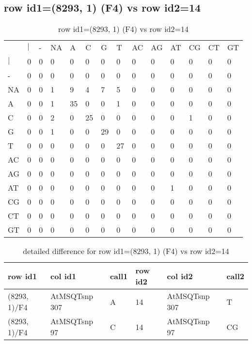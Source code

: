 \subsection{row id1=(8293, 1) (F4) vs row id2=14}
\begin{center}
\begin{longtable}{|l|l|l|l|l|l|l|l|l|l|l|l|l|l|}
\caption{row id1=(8293, 1) (F4) vs row id2=14} \label{table_dm270}\\
\hline
\\
\hline
&$|$&-&NA&A&C&G&T&AC&AG&AT&CG&CT&GT\\
$|$&0&0&0&0&0&0&0&0&0&0&0&0&0\\
-&0&0&0&0&0&0&0&0&0&0&0&0&0\\
NA&0&0&1&9&4&7&5&0&0&0&0&0&0\\
A&0&0&1&35&0&0&1&0&0&0&0&0&0\\
C&0&0&2&0&25&0&0&0&0&0&1&0&0\\
G&0&0&1&0&0&29&0&0&0&0&0&0&0\\
T&0&0&0&0&0&0&27&0&0&0&0&0&0\\
AC&0&0&0&0&0&0&0&0&0&0&0&0&0\\
AG&0&0&0&0&0&0&0&0&0&0&0&0&0\\
AT&0&0&0&0&0&0&0&0&0&1&0&0&0\\
CG&0&0&0&0&0&0&0&0&0&0&0&0&0\\
CT&0&0&0&0&0&0&0&0&0&0&0&0&0\\
GT&0&0&0&0&0&0&0&0&0&0&0&0&0\\
\hline
\end{longtable}
\end{center}

\begin{center}
\begin{longtable}{|l|l|l|l|l|l|}
\caption{detailed difference for row id1=(8293, 1) (F4) vs row id2=14} \label{table_dm271}\\
\hline
row id1&col id1&call1&row id2&col id2&call2\\
\hline
(8293, 1)/F4&AtMSQTsnp 307&A&14&AtMSQTsnp 307&T\\
(8293, 1)/F4&AtMSQTsnp 97&C&14&AtMSQTsnp 97&CG\\
\hline
\end{longtable}
\end{center}

